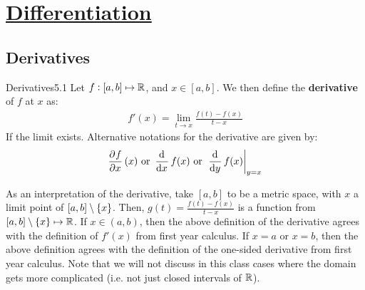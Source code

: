 \newpage
\section[Differentiation]{\hyperlink{toc}{Differentiation}}

\subsection{Derivatives}
\begin{definition}{Derivatives}{5.1}
    Let $f: [a, b] \mapsto \mathbb{R}$, and $x \in [a, b]$. We then define the \textbf{derivative} of $f$ at $x$ as:
    \begin{align*}
        f'(x) = \lim_{t\rightarrow x} \frac{f(t) - f(x)}{t - x}
    \end{align*}
    If the limit exists. Alternative notations for the derivative are given by:
    \begin{align*}
        \dpd{f}{x}(x) \text{ or } \dod{}{x}f(x) \text { or } \left.\dod{}{y}f(x)\right|_{y = x}
    \end{align*}
\end{definition}
As an interpretation of the derivative, take $[a, b]$ to be a metric space, with $x$ a limit point of $[a, b] \setminus \set{x}$. Then, $g(t) = \frac{f(t) - f(x)}{t - x}$ is a function from $[a, b] \setminus \set{x} \mapsto \mathbb{R}$. If $x \in (a, b)$, then the above definition of the derivative agrees with the definition of $f'(x)$ from first year calculus. If $x = a$ or $x = b$, then the above definition agrees with the definition of the one-sided derivative from first year calculus. Note that we will not discuss in this class cases where the domain gets more complicated (i.e. not just closed intervals of $\mathbb{R}$).

